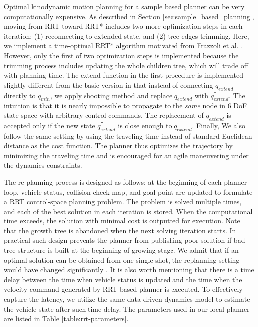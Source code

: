 \documentclass[../thesis.tex]{subfiles}
\begin{document}
Optimal kinodynamic motion planning for a sample based planner can be very computationally expensive.
As described in Section \ref{sec:sample_based_planning}, moving from RRT toward RRT* includes two more optimization steps in each iteration: (1) reconnecting to extended state, and (2) tree edges trimming. 
Here, we implement a time-optimal RRT* algorithm motivated from Frazzoli et al. \cite{hwan2011anytime}. 
However, only the first of two optimization steps is implemented because the trimming process includes updating the whole children tree, which will trade off with planning time. 
The extend function in the first procedure is implemented slightly different from the basic version in that instead of connecting $q_{extend}$ directly to $q_{min}$, we apply shooting method and replace $q_{extend}$ with $q^{''}_{extend}$. 
The intuition is that it is nearly impossible to propagate to the \textit{same} node in 6 DoF state space with arbitrary control commands. 
The replacement of $q_{extend}$ is accepted only if the new state $q^{''}_{extend}$ is close enough to $q_{extend}$. 
Finally, We also follow the same setting by using the traveling time instead of standard Euclidean distance as the cost function. 
The planner thus optimizes the trajectory by minimizing the traveling time and is encouraged for an agile maneuvering under the dynamics constraints.

The re-planning process is designed as follows: at the beginning of each planner loop, vehicle status, collision check map, and goal point are updated to formulate a RRT control-space planning problem. 
The problem is solved multiple times, and each of the best solution in each iteration is stored.
When the computational time exceeds, the solution with minimal cost is outputted for execution. 
Note that the growth tree is abandoned when the next solving iteration starts. 
In practical such design prevents the planner from publishing poor solution if bad tree structure is built at the beginning of growing stage. 
We admit that if an optimal solution can be obtained from one single shot, the replanning setting would have changed significantly \cite{ferguson2006replanning}. 
It is also worth mentioning that there is a time delay between the time when vehicle status is updated and the time when the velocity command generated by RRT-based planner is executed. 
To effectively capture the latency, we utilize the same data-driven dynamics model to estimate the vehicle state after such time delay. 
The parameters used in our local planner are listed in Table \ref{table:rrt-parameters}. 
\end{document}
